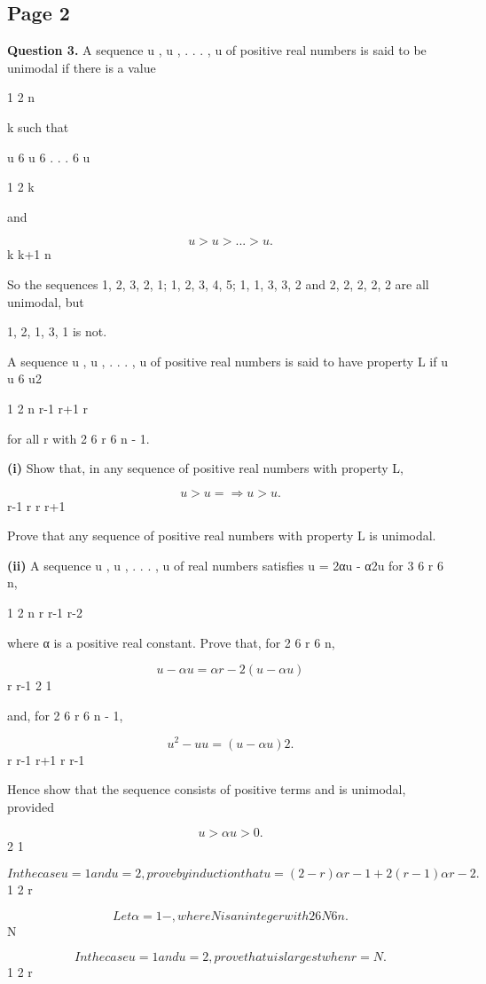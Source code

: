 \documentclass[12pt]{article}
\begin{document}
\subsection*{Page 2}
\begin{flushleft}
\bigskip\textbf{Question 3.} A sequence u , u , . . . , u of positive real numbers is said to be unimodal if there is a value\par
1 2 n\par
k such that\par
u 6 u 6 . . . 6 u\par
1 2 k\par
and\par
\[u > u > . . . > u .\]
k k+1 n\par
So the sequences 1, 2, 3, 2, 1; 1, 2, 3, 4, 5; 1, 1, 3, 3, 2 and 2, 2, 2, 2, 2 are all unimodal, but\par
1, 2, 1, 3, 1 is not.\par
A sequence u , u , . . . , u of positive real numbers is said to have property L if u u 6 u2\par
1 2 n r-1 r+1 r\par
for all r with 2 6 r 6 n - 1.\par
\textbf{(i)} Show that, in any sequence of positive real numbers with property L,\par
\[u > u =⇒ u > u .\]
r-1 r r r+1\par
Prove that any sequence of positive real numbers with property L is unimodal.\par
\textbf{(ii)} A sequence u , u , . . . , u of real numbers satisfies u = 2αu - α2u for 3 6 r 6 n,\par
1 2 n r r-1 r-2\par
where α is a positive real constant. Prove that, for 2 6 r 6 n,\par
\[u - αu = αr-2(u - αu )\]
r r-1 2 1\par
and, for 2 6 r 6 n - 1,\par
\[u^2 - u u = (u - αu )2.\]
r r-1 r+1 r r-1\par
Hence show that the sequence consists of positive terms and is unimodal, provided\par
\[u > αu > 0.\]
2 1\par
\[In the case u = 1 and u = 2, prove by induction that u = (2 - r)αr-1 + 2(r - 1)αr-2.\]
1 2 r\par
\[Let α = 1 - , where N is an integer with 2 6 N 6 n.\]
N\par
\[In the case u = 1 and u = 2, prove that u is largest when r = N .\]
1 2 r\par
\end{flushleft}
\end{document}
